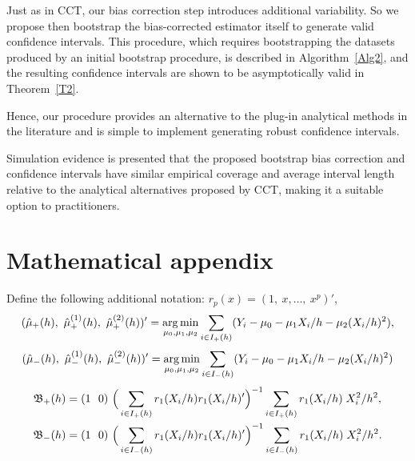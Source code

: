 \documentclass[12pt,fleqn]{article}
\begin{document}
Just as in CCT, our bias correction step introduces additional variability.  So we propose then bootstrap the bias-corrected estimator itself to
 generate valid confidence intervals. This procedure, which requires bootstrapping the datasets produced by an initial bootstrap procedure, is described in Algorithm~\ref{Alg2},
 and the resulting confidence intervals are shown to be asymptotically valid in Theorem~\ref{T2}.

 Hence, our procedure provides an alternative to the plug-in analytical methods in the literature and is simple to implement generating robust confidence intervals.

Simulation evidence is presented that the proposed bootstrap bias correction and confidence intervals have similar empirical coverage and average interval length relative to
 the analytical alternatives proposed by CCT, making it a suitable option to practitioners.

\appendix
\section{Mathematical appendix}

Define the following additional notation:
$r_p(x) = (1,\ x,\dots,\ x^p)'$,
\begin{equation*}
  (\hat{\mu}_{+}(h),\ \hat{\mu}_{+}^{(1)}(h),\ \hat\mu_{+}^{(2)}(h))' =
  \argmin_{\mu_0, \mu_1, \mu_2} \ssum[+]{i}{h} (Y_i - \mu_0 - \mu_1 X_i/h - \mu_2 (X_i/h)^2),
\end{equation*}
\begin{equation*}
(\hat{\mu}_{-}(h),\ \hat{\mu}_{-}^{(1)}(h),\ \hat\mu_{-}^{(2)}(h))' =
  \argmin_{\mu_0, \mu_1, \mu_2} \ssum[-]{i}{h} (Y_i - \mu_0 - \mu_1 X_i/h - \mu_2 (X_i/h)^2) \\
\end{equation*}
\begin{align}
  \label{eq:5}
  \Bf_+(h)
  & = (1\ \  0)\ \Big(\ssum[+]{i}{h} r_1(X_i/h) r_1(X_i/h)' \Big)^{-1}
    \ssum[+]{i}{h} r_1(X_i/h) \; X_i^2 / h^2, \\
  \label{eq:6}
  \Bf_-(h)
  & = (1\ \ 0)\ \Big(\ssum[-]{i}{h} r_1(X_i/h) r_1(X_i/h)' \Big)^{-1}
    \ssum[-]{i}{h} r_1(X_i/h) \; X_i^2 / h^2.
\end{align}
\end{document}
